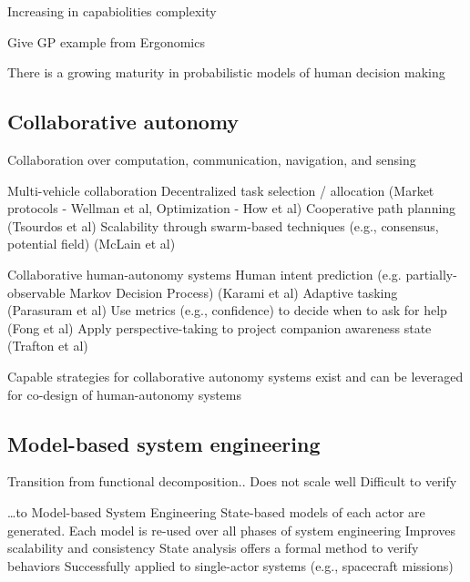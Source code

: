Increasing in capabiolities complexity

Give GP example from Ergonomics


There is a growing maturity in probabilistic models of human decision making


\subsection*{Collaborative autonomy}

Collaboration over computation, communication, navigation, and sensing

Multi-vehicle collaboration 
Decentralized task selection / allocation (Market protocols - Wellman et al, Optimization - How et al) 
Cooperative path planning (Tsourdos et al)
Scalability through swarm-based techniques (e.g., consensus, potential field)  (McLain et al)

Collaborative human-autonomy systems
Human intent prediction (e.g. partially-observable Markov Decision Process) (Karami et al)
Adaptive tasking (Parasuram et al)
Use metrics (e.g., confidence) to decide when to ask for help (Fong et al) 
Apply perspective-taking to project companion awareness state (Trafton et al)


Capable strategies for collaborative autonomy systems exist and can be 
leveraged for co-design of human-autonomy systems


\subsection*{Model-based system engineering}
Transition from functional decomposition..
Does not scale well
Difficult to verify


…to Model-based System Engineering 
State-based models of each actor are generated.
Each model is re-used over all phases of system engineering
Improves scalability and consistency
State analysis offers a formal method to verify behaviors
Successfully applied to single-actor systems (e.g., spacecraft missions)

